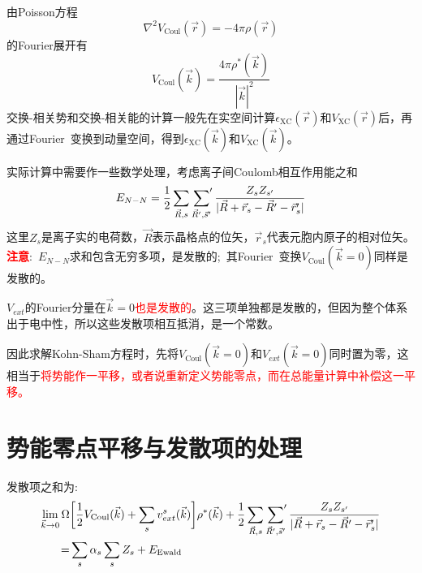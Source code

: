 \documentclass{article}      %
\begin{document}
由\textrm{Poisson}方程
\begin{equation}
	\nabla^2V_{\mathrm{Coul}}(\vec r)=-4\pi\rho(\vec r)
	\label{eq:Poisson}
\end{equation}
的\textrm{Fourier}展开有
\begin{equation}
	V_{\mathrm{Coul}}(\vec k)=\dfrac{4\pi\rho^{\ast}(\vec k)}{|\vec k|^2}
	\label{eq:FFT_Poisson}
\end{equation}
交换-相关势和交换-相关能的计算一般先在实空间计算$\epsilon_{\mathrm{XC}}(\vec r)$和$V_{\mathrm{XC}}(\vec r)$后，再通过\textrm{Fourier~}变换到动量空间，得到$\epsilon_{\mathrm{XC}}(\vec k)$和$V_{\mathrm{XC}}(\vec k)$。

实际计算中需要作一些数学处理，考虑离子间\textrm{Coulomb}相互作用能之和
	\begin{equation}
		E_{N-N}=\dfrac12\sum_{\vec R,s}\sideset{}{^{\prime}}\sum_{\vec R^{\prime},\vec s^{\prime}}\dfrac{Z_sZ_{s^{\prime}}}{|\vec R+\vec r_s-\vec R^{\prime}-\vec r_s^{\prime}|}
		\label{eq:Ion_Coulomb_ENE}
	\end{equation}
这里$Z_s$是离子实的电荷数，$\vec R$表示晶格点的位矢，$\vec r_s$代表元胞内原子的相对位矢。
\textcolor{red}{\textbf{注意}}:~$E_{N-N}$求和包含无穷多项，是发散的;~其\textrm{Fourier~}变换$V_{\mathrm{Coul}}(\vec k=0)$同样是发散的。
	
$V_{ext}$的\textrm{Fourier}分量在$\vec k=0$\textcolor{red}{也是发散的}。这三项单独都是发散的，但因为整个体系出于电中性，所以这些发散项相互抵消，是一个常数。

因此求解\textrm{Kohn-Sham}方程时，先将$V_{\mathrm{Coul}}(\vec k=0)$和$V_{ext}(\vec k=0)$同时置为零，这相当于\textcolor{red}{将势能作一平移，或者说重新定义势能零点，而在总能量计算中补偿这一平移。}

\section{势能零点平移与发散项的处理}
发散项之和为:~
	\begin{equation}
		\begin{aligned}
			\lim_{\vec k\rightarrow0}\Omega&\bigg[\dfrac12V_{\mathrm{Coul}}(\vec k)+\sum_sv_{ext}^s(\vec k)\bigg]\rho^{\ast}(\vec k)+\dfrac12\sum_{\vec R,s}\sideset{}{^{\prime}}\sum_{\vec R^{\prime},\vec s^{\prime}}\dfrac{Z_sZ_{s^{\prime}}}{|\vec R+\vec r_s-\vec R^{\prime}-\vec r_s^{\prime}|}\\
			=&\sum_s\alpha_s\sum_sZ_s+E_{\mathrm{Ewald}}
		\end{aligned}
		\label{eq:diver-term}
	\end{equation}
	
\end{document}
